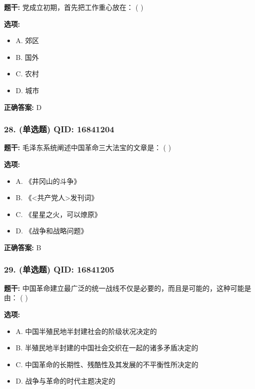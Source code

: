 \documentclass[12pt,UTF8]{ctexart}
\begin{document}
\textbf{题干:}
党成立初期，首先把工作重心放在： ( )

\textbf{选项:}
\begin{itemize}[leftmargin=*]

  \item A. 郊区

  \item B. 国外

  \item C. 农村

  \item D. 城市

\end{itemize}

\textbf{正确答案:}
D

\vspace{0.3em}\hrulefill\vspace{0.7em}

\subsubsection*{28. (单选题) \small QID: 16841204}

\textbf{题干:}
毛泽东系统阐述中国革命三大法宝的文章是： ( )

\textbf{选项:}
\begin{itemize}[leftmargin=*]

  \item A. 《井冈山的斗争》

  \item B. 《<共产党人>发刊词》

  \item C. 《星星之火，可以燎原》

  \item D. 《战争和战略问题》

\end{itemize}

\textbf{正确答案:}
B

\vspace{0.3em}\hrulefill\vspace{0.7em}

\subsubsection*{29. (单选题) \small QID: 16841205}

\textbf{题干:}
中国革命建立最广泛的统一战线不仅是必要的，而且是可能的，这种可能是由： ( )

\textbf{选项:}
\begin{itemize}[leftmargin=*]

  \item A. 中国半殖民地半封建社会的阶级状况决定的

  \item B. 半殖民地半封建的中国社会交织在一起的诸多矛盾决定的

  \item C. 中国革命的长期性、残酷性及其发展的不平衡性所决定的

  \item D. 战争与革命的时代主题决定的

\end{itemize}
\end{document}
